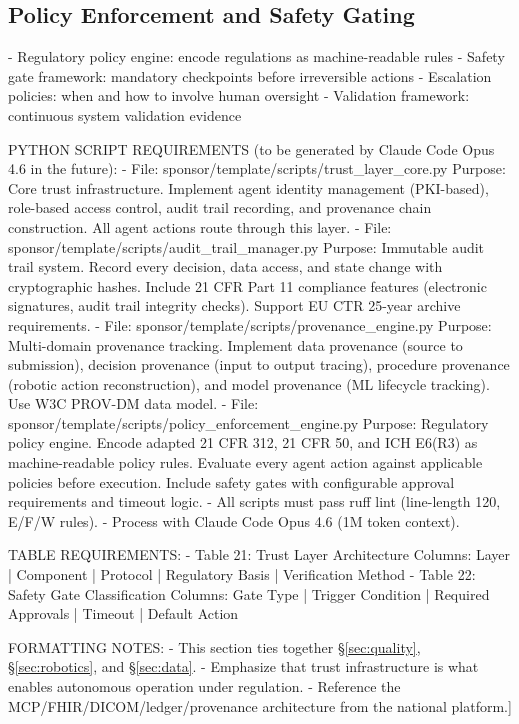 \subsection{Policy Enforcement and Safety Gating}
- Regulatory policy engine: encode regulations as machine-readable rules
- Safety gate framework: mandatory checkpoints before irreversible actions
- Escalation policies: when and how to involve human oversight
- Validation framework: continuous system validation evidence

PYTHON SCRIPT REQUIREMENTS (to be generated by Claude Code Opus 4.6 in the future):
- File: sponsor/template/scripts/trust\_layer\_core.py
  Purpose: Core trust infrastructure. Implement agent identity management
  (PKI-based), role-based access control, audit trail recording, and
  provenance chain construction. All agent actions route through this layer.
- File: sponsor/template/scripts/audit\_trail\_manager.py
  Purpose: Immutable audit trail system. Record every decision, data access,
  and state change with cryptographic hashes. Include 21 CFR Part 11
  compliance features (electronic signatures, audit trail integrity checks).
  Support EU CTR 25-year archive requirements.
- File: sponsor/template/scripts/provenance\_engine.py
  Purpose: Multi-domain provenance tracking. Implement data provenance
  (source to submission), decision provenance (input to output tracing),
  procedure provenance (robotic action reconstruction), and model
  provenance (ML lifecycle tracking). Use W3C PROV-DM data model.
- File: sponsor/template/scripts/policy\_enforcement\_engine.py
  Purpose: Regulatory policy engine. Encode adapted 21 CFR 312, 21 CFR 50,
  and ICH E6(R3) as machine-readable policy rules. Evaluate every agent
  action against applicable policies before execution. Include safety
  gates with configurable approval requirements and timeout logic.
- All scripts must pass ruff lint (line-length 120, E/F/W rules).
- Process with Claude Code Opus 4.6 (1M token context).

TABLE REQUIREMENTS:
- Table 21: Trust Layer Architecture
  Columns: Layer | Component | Protocol | Regulatory Basis | Verification Method
- Table 22: Safety Gate Classification
  Columns: Gate Type | Trigger Condition | Required Approvals | Timeout | Default Action

FORMATTING NOTES:
- This section ties together \S\ref{sec:quality}, \S\ref{sec:robotics}, and \S\ref{sec:data}.
- Emphasize that trust infrastructure is what enables autonomous operation under regulation.
- Reference the MCP/FHIR/DICOM/ledger/provenance architecture from the national platform.]


